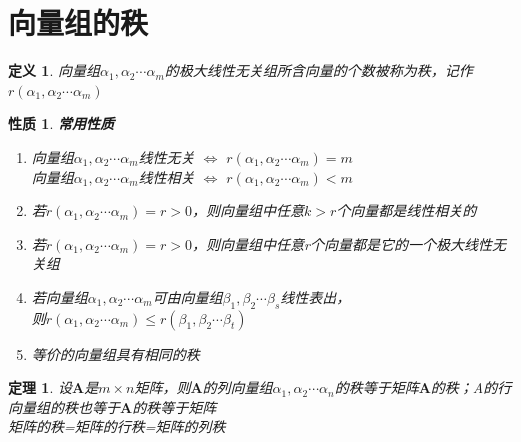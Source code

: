 \documentclass[12pt,oneside]{ctexbook}
\newtheorem{definition}[subsection]{定义}
\newtheorem{theorem}[subsection]{定理}
\newtheorem{property}[subsection]{性质}
\begin{document}
\section{向量组的秩}
\begin{definition}
    向量组\(\alpha_1,\alpha_2 \cdots \alpha_m\)的极大线性无关组所含向量的个数被称为秩，记作\(r(\alpha_1,\alpha_2 \cdots \alpha_m)\)
\end{definition}
\begin{property}
    \textbf{常用性质}
    \begin{enumerate}
        \item 向量组\(\alpha_1,\alpha_2 \cdots \alpha_m\)线性无关 \(\Leftrightarrow\) \(r(\alpha_1,\alpha_2 \cdots \alpha_m)=m\) \\ 向量组\(\alpha_1,\alpha_2 \cdots \alpha_m\)线性相关 \(\Leftrightarrow\) \(r(\alpha_1,\alpha_2 \cdots \alpha_m)<m\)
        \item 若\(r(\alpha_1,\alpha_2 \cdots \alpha_m)=r>0\)，则向量组中任意\(k>r\)个向量都是线性相关的
        \item 若\(r(\alpha_1,\alpha_2 \cdots \alpha_m)=r>0\)，则向量组中任意r个向量都是它的一个极大线性无关组
        \item 若向量组\(\alpha_1,\alpha_2 \cdots \alpha_m\)可由向量组\(\beta_1,\beta_2 \cdots \beta_s\)线性表出，
        \\则\(r(\alpha_1,\alpha_2 \cdots \alpha_m) \leq r(\beta_1,\beta_2 \cdots \beta_t)\)
        \item 等价的向量组具有相同的秩
    \end{enumerate}
\end{property}
\begin{theorem}
    设\(\mathbf{A}\)是\(m \times n\)矩阵，则\(\mathbf{A}\)的列向量组\(\alpha_1,\alpha_2 \cdots \alpha_n\)的秩等于矩阵\(\mathbf{A}\)的秩；A的行向量组的秩也等于\(\mathbf{A}\)的秩等于矩阵
    \\矩阵的秩=矩阵的行秩=矩阵的列秩
\end{theorem}
\end{document}
